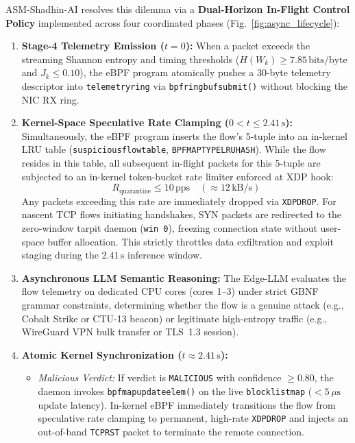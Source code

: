 \documentclass{ieeeaccess}
\renewcommand{\_}{\textunderscore\allowbreak}
\begin{document}
ASM-Shadhin-AI resolves this dilemma via a \textbf{Dual-Horizon In-Flight Control Policy} implemented across four coordinated phases (Fig.~\ref{fig:async_lifecycle}):
\begin{enumerate}
  \item \textbf{Stage-4 Telemetry Emission ($t = 0$):} When a packet exceeds the streaming Shannon entropy and timing thresholds ($H(W_k) \ge 7.85\,\text{bits/byte}$ and $J_k \le 0.10$), the eBPF program atomically pushes a 30-byte telemetry descriptor into \texttt{telemetry\_ring} via \texttt{bpf\_ringbuf\_submit()} without blocking the NIC RX ring.
  \item \textbf{Kernel-Space Speculative Rate Clamping ($0 < t \le 2.41\,\text{s}$):} Simultaneously, the eBPF program inserts the flow's 5-tuple into an in-kernel LRU table (\texttt{suspicious\_flow\_table}, \texttt{BPF\_MAP\_TYPE\_LRU\_HASH}). While the flow resides in this table, all subsequent in-flight packets for this 5-tuple are subjected to an in-kernel token-bucket rate limiter enforced at XDP hook:
  \begin{equation}
    R_{\text{quarantine}} \le 10\,\text{pps} \quad (\approx 12\,\text{kB/s})
    \label{eq:rate_limit}
  \end{equation}
  Any packets exceeding this rate are immediately dropped via \texttt{XDP\_DROP}. For nascent TCP flows initiating handshakes, SYN packets are redirected to the zero-window tarpit daemon (\texttt{win~0}), freezing connection state without user-space buffer allocation. This strictly throttles data exfiltration and exploit staging during the $2.41\,\text{s}$ inference window.
  \item \textbf{Asynchronous LLM Semantic Reasoning:} The Edge-LLM evaluates the flow telemetry on dedicated CPU cores (cores 1--3) under strict GBNF grammar constraints, determining whether the flow is a genuine attack (e.g., Cobalt Strike or CTU-13 beacon) or legitimate high-entropy traffic (e.g., WireGuard VPN bulk transfer or TLS~1.3 session).
  \item \textbf{Atomic Kernel Synchronization ($t \approx 2.41\,\text{s}$):}
  \begin{itemize}
    \item \textit{Malicious Verdict:} If verdict is \texttt{MALICIOUS} with confidence $\ge 0.80$, the daemon invokes \texttt{bpf\_map\_update\_elem()} on the live \texttt{blocklist\_map} ($< 5\,\mu\text{s}$ update latency). In-kernel eBPF immediately transitions the flow from speculative rate clamping to permanent, high-rate \texttt{XDP\_DROP} and injects an out-of-band \texttt{TCP\_RST} packet to terminate the remote connection.

\end{itemize}
\end{enumerate}
\end{document}
